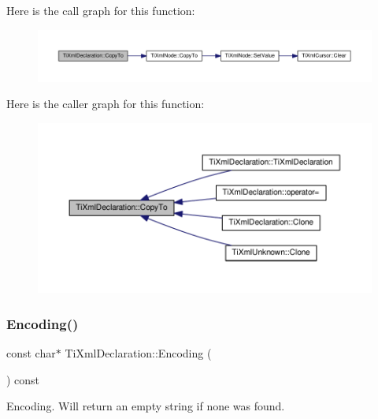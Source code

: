 Here is the call graph for this function\+:\nopagebreak
\begin{figure}[H]
\begin{center}
\leavevmode
\includegraphics[width=350pt]{class_ti_xml_declaration_a189de17b3e04d4e5b1c385336f214af1_cgraph}
\end{center}
\end{figure}
Here is the caller graph for this function\+:\nopagebreak
\begin{figure}[H]
\begin{center}
\leavevmode
\includegraphics[width=350pt]{class_ti_xml_declaration_a189de17b3e04d4e5b1c385336f214af1_icgraph}
\end{center}
\end{figure}
\mbox{\label{class_ti_xml_declaration_a8d3d1b5b226daa8353276d719497be80}} 
\subsubsection{\texorpdfstring{Encoding()}{Encoding()}}
{\footnotesize\ttfamily const char$\ast$ Ti\+Xml\+Declaration\+::\+Encoding (\begin{DoxyParamCaption}{ }\end{DoxyParamCaption}) const\hspace{0.3cm}{\ttfamily [inline]}}



Encoding. Will return an empty string if none was found. 

